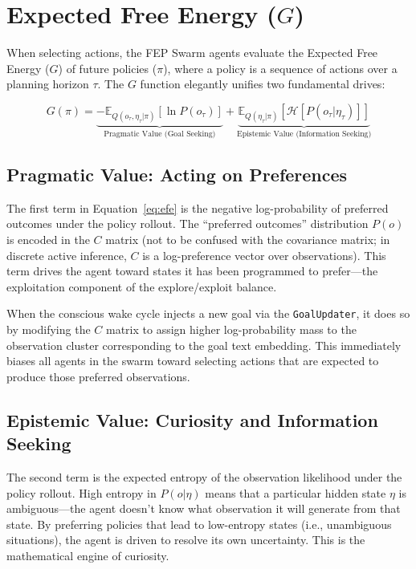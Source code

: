 \section{Expected Free Energy ($G$)}

When selecting actions, the FEP Swarm agents evaluate the Expected Free Energy ($G$) of future policies ($\pi$), where a policy is a sequence of actions over a planning horizon $\tau$. The $G$ function elegantly unifies two fundamental drives:

\begin{equation}
G(\pi) = \underbrace{-\mathbb{E}_{Q(o_\tau, \eta_\tau | \pi)}\left[\ln P(o_\tau)\right]}_{\text{Pragmatic Value (Goal Seeking)}} + \underbrace{\mathbb{E}_{Q(\eta_\tau | \pi)}\left[\mathcal{H}\left[P(o_\tau | \eta_\tau)\right]\right]}_{\text{Epistemic Value (Information Seeking)}}
\label{eq:efe}
\end{equation}

\subsection{Pragmatic Value: Acting on Preferences}

The first term in Equation~\ref{eq:efe} is the negative log-probability of preferred outcomes under the policy rollout. The ``preferred outcomes'' distribution $P(o)$ is encoded in the $C$ matrix (not to be confused with the covariance matrix; in discrete active inference, $C$ is a log-preference vector over observations). This term drives the agent toward states it has been programmed to prefer---the exploitation component of the explore/exploit balance.

When the conscious wake cycle injects a new goal via the \texttt{GoalUpdater}, it does so by modifying the $C$ matrix to assign higher log-probability mass to the observation cluster corresponding to the goal text embedding. This immediately biases all agents in the swarm toward selecting actions that are expected to produce those preferred observations.

\subsection{Epistemic Value: Curiosity and Information Seeking}

The second term is the expected entropy of the observation likelihood under the policy rollout. High entropy in $P(o | \eta)$ means that a particular hidden state $\eta$ is ambiguous---the agent doesn't know what observation it will generate from that state. By preferring policies that lead to low-entropy states (i.e., unambiguous situations), the agent is driven to resolve its own uncertainty. This is the mathematical engine of curiosity.

